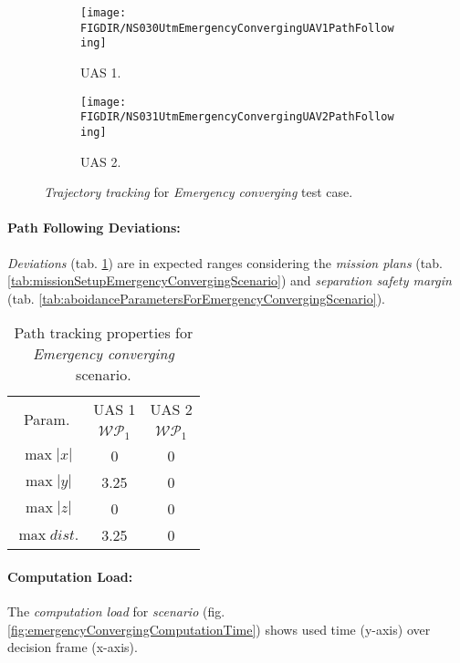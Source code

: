 \begin{figure}[H]
    \centering
    \begin{subfigure}{0.48\textwidth}
    	\centering
        \texttt{[image: \\FIGDIR/NS030UtmEmergencyConvergingUAV1PathFollowing]}
        \caption{UAS 1.}
        \label{fig:emergencyConvergingUAS1PathTracking}
    \end{subfigure}
    \begin{subfigure}{0.48\textwidth}
	    \centering
        \texttt{[image: \\FIGDIR/NS031UtmEmergencyConvergingUAV2PathFollowing]} 
        \caption{UAS 2.}
        \label{fig:emergencyCovnergingUAS2PathTracking}
    \end{subfigure}
    \caption{\emph{Trajectory tracking} for \emph{Emergency converging} test case. }
    \label{fig:emergencyConvergingTrajectoryTrackingPerformance}
\end{figure}

\paragraph{Path Following Deviations:} \emph{Deviations} (tab. \ref{tab:pathTrackingParametersForEmergencyConverging}) are in expected ranges considering the  \emph{mission plans} (tab. \ref{tab:missionSetupEmergencyConvergingScenario}) and \emph{separation safety margin} (tab. \ref{tab:aboidanceParametersForEmergencyConvergingScenario}).
    
\begin{table}[H]
    \centering
    \begin{tabular}{c||c|c}
        \multirow{2}{*}{Param.} & UAS 1     & UAS 2\\\cline{2-3}
                        & $\mathscr{WP}_1$  & $\mathscr{WP}_1$\\\hline\hline
          $\max |x|$    & 0                 & 0 \\\hline
          $\max |y|$    & 3.25              & 0 \\\hline
          $\max |z|$    & 0                 & 0 \\\hline
          $\max dist.$  & 3.25              & 0 \\
    \end{tabular}
    \caption{Path tracking properties for \emph{Emergency converging} scenario.}
    \label{tab:pathTrackingParametersForEmergencyConverging}
\end{table}

\paragraph{Computation Load:} The \emph{computation load} for \emph{scenario} (fig.\ref{fig:emergencyConvergingComputationTime}) shows used time (y-axis) over decision frame (x-axis).

